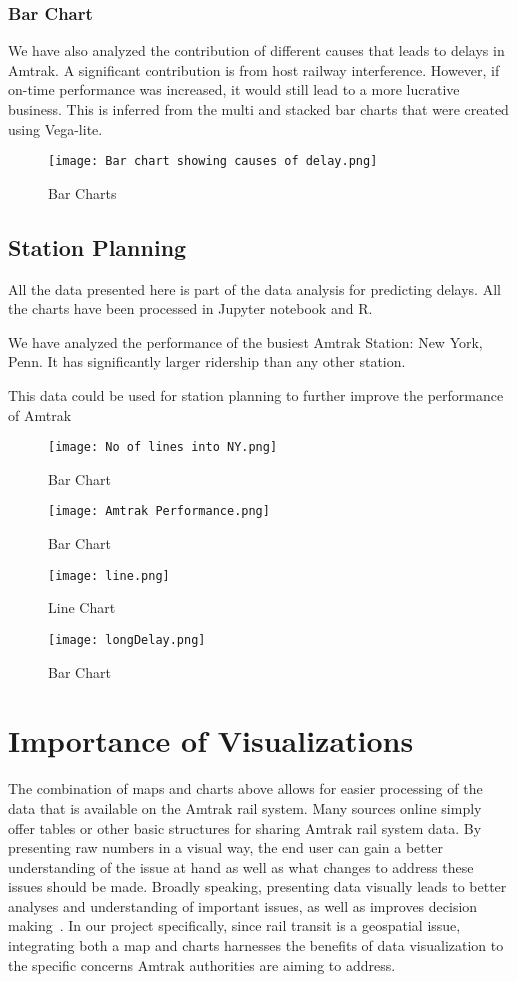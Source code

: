 \documentclass[runningheads]{llncs}
\begin{document}
\subsubsection{Bar Chart}
We have also analyzed the contribution of different causes that leads to delays in Amtrak. A significant contribution is from host railway interference. However, if on-time performance was increased, it would still lead to a more lucrative business. This is inferred from the multi and stacked bar charts that were created using Vega-lite. 
\begin{figure}
    \centering
    \texttt{[image: Bar chart showing causes of delay.png]}
    \caption{Bar Charts}
    \label{fig:8}
\end{figure}
\subsection{Station Planning}
All the data presented here is part of the data analysis for predicting delays. All the charts have been processed in Jupyter notebook and R.

We have analyzed the performance of the busiest Amtrak Station: New York, Penn. It has significantly larger ridership than any other station.

This data could be used for station planning to further improve the performance of Amtrak
\begin{figure}
    \centering
    \texttt{[image: No of lines into NY.png]}
    \caption{Bar Chart}
    \label{fig:9}
\end{figure}
\begin{figure}
    \centering
    \texttt{[image: Amtrak Performance.png]}
    \caption{Bar Chart}
    \label{fig:10}
\end{figure}
\begin{figure}
    \centering
    \texttt{[image: line.png]}
    \caption{Line Chart}
    \label{fig:11}
\end{figure}
\begin{figure}
    \centering
    \texttt{[image: longDelay.png]}
    \caption{Bar Chart}
    \label{fig:12}
\end{figure}

\section{Importance of Visualizations}
The combination of maps and charts above allows for easier processing of the data that is available on the Amtrak rail system. Many sources online simply offer tables or other basic structures for sharing Amtrak rail system data. By presenting raw numbers in a visual way, the end user can gain a better understanding of the issue at hand as well as what changes to address these issues should be made. Broadly speaking, presenting data visually leads to better analyses and understanding of important issues, as well as improves decision making~\cite{url2}. In our project specifically, since rail transit is a geospatial issue, integrating both a map and charts harnesses the benefits of data visualization to the specific concerns Amtrak authorities are aiming to address.
\end{document}
